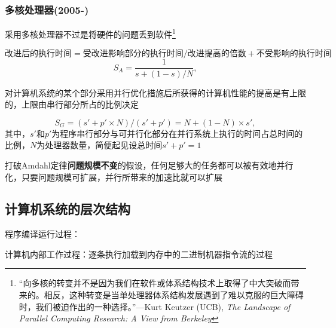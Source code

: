 \subsubsection{多核处理器(2005-)}
采用多核处理器不过是将硬件的问题丢到软件\footnote{“向多核的转变并不是因为我们在软件或体系结构技术上取得了中大突破而带来的。相反，这种转变是当单处理器体系结构发展遇到了难以克服的巨大障碍时，我们被迫作出的一种选择。”---Kurt Keutzer (UCB), \emph{The Landscape of Parallel Computing Research: A View from Berkeley}}
\begin{theorem}
\label{thm:amdahl}
\[\text{改进后的执行时间}=\text{受改进影响部分的执行时间}/\text{改进提高的倍数}+\text{不受影响的执行时间}\]
\[S_A=\frac{1}{s+(1-s)/N},\]
\end{theorem}
对计算机系统的某个部分采用并行优化措施后所获得的计算机性能的提高是有上限的，上限由串行部分所占的比例决定
\begin{theorem}
\[S_G=(s'+p'\times N)/(s'+p')=N+(1-N)\times s',\]
其中，$s'$和$p'$为程序串行部分与可并行化部分在并行系统上执行的时间占总时间的比例，$N$为处理器数量，简便起见设总时间$s'+p'=1$
\end{theorem}
打破Amdahl定律\textbf{问题规模不变}的假设，任何足够大的任务都可以被有效地并行化，只要问题规模可扩展，并行所带来的加速比就可以扩展


\subsection{计算机系统的层次结构}
\begin{center}
\end{center}
程序编译运行过程：
\begin{center}
\end{center}
计算机内部工作过程：逐条执行加载到内存中的二进制机器指令流的过程

